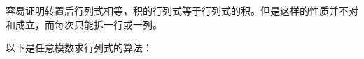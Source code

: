 容易证明转置后行列式相等，积的行列式等于行列式的积。但是这样的性质并不对和成立，而每次只能拆一行或一列。

以下是任意模数求行列式的算法：
\inputminted{cpp}{src/linear/det.cpp}